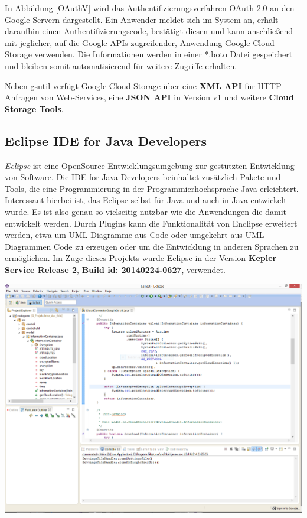 \documentclass[13pt,a4paper,bibliography=totocnumbered,listof=totocnumbered]{scrartcl}
\begin{document}
In Abbildung \ref{OAuthV} wird das Authentifizierungsverfahren OAuth 2.0 an den Google-Servern dargestellt. Ein Anwender meldet sich im System an, erhält daraufhin einen Authentifizierungscode, bestätigt diesen und kann anschließend mit jeglicher, auf die Google APIs zugreifender, Anwendung Google Cloud Storage verwenden. Die Informationen werden in einer *.boto Datei gespeichert und bleiben somit automatisierend für weitere Zugriffe erhalten. \cite{46}

Neben gsutil verfügt Google Cloud Storage über eine \textbf{XML API} für HTTP-Anfragen von Web-Services, eine \textbf{JSON API} in Version v1 und weitere \textbf{Cloud Storage Tools}.

\subsection{Eclipse IDE for Java Developers}
\href{https://www.eclipse.org/}{\textit{Eclipse}} ist eine OpenSource Entwicklungsumgebung zur gestützten Entwicklung von Software. Die IDE for Java Developers beinhaltet zusätzlich Pakete und Tools, die eine Programmierung in der Programmierhochsprache Java erleichtert. Interessant hierbei ist, das Eclipse selbst für Java und auch in Java entwickelt wurde. Es ist also genau so vielseitig nutzbar wie die Anwendungen die damit entwickelt werden. Durch Plugins kann die Funktionalität von Enclipse erweitert werden, etwa um UML Diagramme aus Code oder umgekehrt aus UML Diagrammen Code zu erzeugen oder um die Entwicklung in anderen Sprachen zu ermöglichen. Im Zuge dieses Projekts wurde Eclipse in der Version \textbf{Kepler Service Release 2}, \textbf{Build id: 20140224-0627}, verwendet.
\vspace{1em}
$\;$\\
\begin{minipage}{\linewidth}
	\centering
	\includegraphics[width=1.0\linewidth]{./img/Eclipse.png}
\end{minipage}
\vspace{1em}
\end{document}
